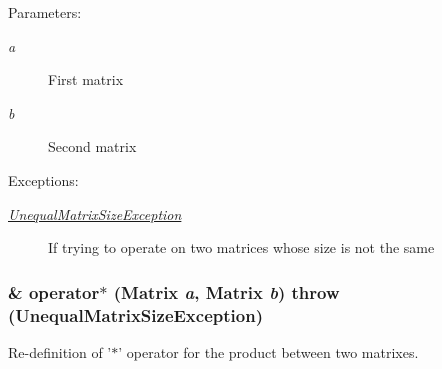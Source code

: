 \begin{Desc}
\item[Parameters:]
\begin{description}
\item[{\em a}]First matrix \item[{\em b}]Second matrix \end{description}
\end{Desc}
\begin{Desc}
\item[Exceptions:]
\begin{description}
\item[{\em \hyperlink{classgrassmann_1_1UnequalMatrixSizeException}{UnequalMatrixSizeException}}]If trying to operate on two matrices whose size is not the same \end{description}
\end{Desc}
\hypertarget{classgrassmann_1_1Matrix_79c865e5316aebc75afcba21bcf102bd}{
\subsubsection[operator$\ast$]{\& operator$\ast$ ({\bf Matrix} {\em a}, \/  {\bf Matrix} {\em b})  throw ({\bf UnequalMatrixSizeException})}}
\label{classgrassmann_1_1Matrix_79c865e5316aebc75afcba21bcf102bd}


Re-definition of '$\ast$' operator for the product between two matrixes. 

